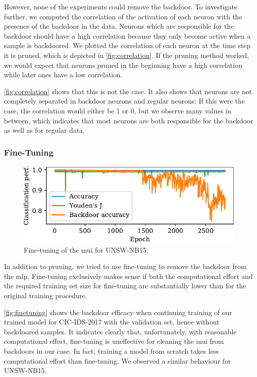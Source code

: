 \documentclass[10pt,sigconf,letterpaper,dvipsnames]{acmart}
\newcommand\note[2]{{\color{#1}#2}}
\newcommand\todo[1]{{\note{red}{TODO: #1}}}
\newcommand{\unsw}{UNSW-NB15}
\newcommand{\cic}{CIC-IDS-2017}
\begin{document}
However, none of the experiments could remove the backdoor.
To investigate further, we computed the correlation of the activation of each neuron with the presence of the backdoor in the data. Neurons which are responsible for the backdoor should have a high correlation because they only become active when a sample is backdoored. We  plotted the correlation of each neuron at the time step it is pruned, which is depicted in \autoref{fig:correlation}. If the pruning method worked, we would expect
that neurons pruned in the beginning have a high correlation while later ones have a low correlation.

\autoref{fig:correlation} shows that this is not the case. It also shows that neurons are not completely separated in backdoor neurons and regular neurons: If this were the case, the correlation would either be 1 or 0, but we observe many values in between, which indicates that most neurons are both responsible for the backdoor as well as for regular data.

\subsubsection{Fine-Tuning}
\begin{figure}[b]
\includegraphics[width=\columnwidth]{figures/finetuning_2017.pdf}
\caption{Fine-tuning of the \gls{mui} for \unsw{}.}
\label{fig:finetuning}
\end{figure}
In addition to pruning, we tried to use fine-tuning to remove the backdoor from the \gls{mlp}. %
Fine-tuning exclusively makes  sense if both the computational effort and the required training set size for fine-tuning are substantially lower than for the original training procedure. 

\autoref{fig:finetuning} shows the backdoor efficacy when continuing training of our trained model for \cic{} with the validation set, hence without backdoored samples.
It indicates clearly that, unfortunately, with reasonable computational effort, fine-tuning is uneffective for cleaning the \gls{mui} from backdoors in our case. In fact, training a model from scratch takes less computational effort than fine-tuning. We observed a similar behaviour for \unsw{}.
\end{document}
